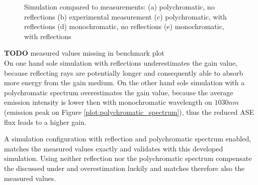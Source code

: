\begin{figure}[H]
  \centerline{
    }
  \caption{Simulation compared to measurements:
    (a) polychromatic, no reflections
    (b) experimental measurement
    (c) polychromatic, with reflections
    (d) monochromatic, no reflections
    (e) monochromatic, with reflections}
  \label{plot:benchmark}
\end{figure}
\textbf{TODO} measured values missing in benchmark plot\\

On one hand sole simulation with reflections underestimates the gain value,
because reflecting rays are potentially longer and consequently able
to absorb more energy from the gain medium. 
On the other hand sole simulation with a polychromatic spectrum overestimates the
gain value, because the average emission intensity is lower then with monochromatic
wavelength on $1030 nm$ (emission peak on Figure \ref{plot:polychromatic_spectrum}), 
thus the reduced  ASE flux leads to a higher gain.

A simulation configuration with reflection and polychromatic spectrum enabled,
matches the measured values exactly and validates with this developed simulation.
Using neither reflection nor the polychromatic spectrum compensate the discussed 
under and overestimation luckily and matches therefore also the measured 
values.


